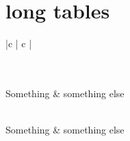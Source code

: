 \documentclass[12pt]{report}
\begin{document}
\section{long tables}
\begin{longtable}[c]{|c | c |}
\caption{test}\\
 \hline
 \\
 \hline
 Something & something else\\
 \hline
 \endfirsthead

 \hline
 \\
 \hline
 Something & something else\\
 \hline
 \endhead

  \hline
 \endfoot


\end{longtable}
\end{document}
